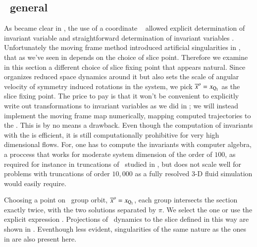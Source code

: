 
\subsection{\label{s:mfReqb}\CLe\  general \slice}

As became clear in , the use of a coordinate \slice\ 
allowed explicit determination of invariant variable  and straightforward
determination of invariant variables . Unfortunately the moving frame
method introduced artificial singularities in \reducedsp, that as we've seen in 
depends on the choice of slice point.
Therefore we examine in this section a different choice of slice fixing point that appears natural.
Since  organizes reduced space dynamics around it but also sets the
scale of angular velocity of symmetry induced rotations in the system, we
pick ${\overline{x}^o}=x_{\mathrm{Q}_{1}}$ as the slice fixing point.
The price to pay is that it won't be convenient to explicitly write out
transformations to invariant variables
as we did in ; we will instead implement the moving frame map numerically,
mapping computed trajectories to the \slice.
This is by no means a drawback. Even though the computation of invariants with the
{\mframes} is efficient, it is still computationally
prohibitive for very high dimensional flows. For, one has
to compute the invariants with computer algebra, a proccess
that works for moderate system dimension of the order of $100$,
as required for instance in truncations of \KSe\ studied in ,
but does not scale well for problems with truncations of order $10,000$ as
a fully resolved $3$-D fluid simulation would easily require.


Choosing a point on \reqv\ group orbit,
${\overline{x}^o}  = x_{\mathrm{Q}_{1}}$,
each group intersects the section exactly twice,  with the
two solutions separated by $\pi$. We select the one 
 or use
the explicit expression .
Projections of \cLe\ dynamics to the slice defined in this way are
shown in \reffig{fig:CLEmfReqb1}. Eventhough less evident, singularities
of the same nature as the ones in \refsect{s:cLeCoordMF} are also present
here.


